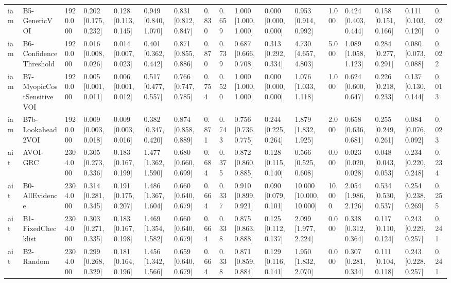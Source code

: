 \begin{table}[!ht]
{\begin{tabular}{lllllllllllllllll}
iam & B5-GenericVOI & 1920.000 & 0.202 [0.175, 0.232] & 0.128 [0.113, 0.145] & 0.949 [0.840, 1.070] & 0.831 [0.812, 0.847] & 0.830 & 0.659 & 1.000 [1.000, 1.000] & 0.000 [0.000, 0.000] & 0.953 [0.914, 0.992] & 1.000 & 0.424 [0.403, 0.444] & 0.158 [0.151, 0.166] & 0.111 [0.103, 0.120] & 0.020 \\
iam & B6-ConfidenceThreshold & 1920.000 & 0.016 [0.008, 0.026] & 0.014 [0.007, 0.023] & 0.401 [0.362, 0.442] & 0.871 [0.855, 0.886] & 0.870 & 0.739 & 0.687 [0.666, 0.708] & 0.313 [0.292, 0.334] & 4.730 [4.657, 4.803] & 5.000 & 1.089 [1.058, 1.123] & 0.284 [0.277, 0.291] & 0.080 [0.073, 0.088] & 0.022 \\
iam & B7-MyopicCostSensitiveVOI & 1920.000 & 0.005 [0.001, 0.011] & 0.006 [0.001, 0.012] & 0.517 [0.477, 0.557] & 0.766 [0.747, 0.785] & 0.754 & 0.520 & 1.000 [1.000, 1.000] & 0.000 [0.000, 0.000] & 1.076 [1.033, 1.118] & 1.000 & 0.624 [0.600, 0.647] & 0.226 [0.218, 0.233] & 0.137 [0.130, 0.144] & 0.013 \\
iam & B7b-Lookahead2VOI & 1920.000 & 0.009 [0.003, 0.018] & 0.009 [0.003, 0.016] & 0.382 [0.347, 0.420] & 0.874 [0.858, 0.889] & 0.871 & 0.743 & 0.756 [0.736, 0.775] & 0.244 [0.225, 0.264] & 1.879 [1.832, 1.925] & 2.000 & 0.658 [0.636, 0.681] & 0.255 [0.249, 0.261] & 0.084 [0.076, 0.092] & 0.023 \\
ait & AVOI-GRC & 2304.000 & 0.305 [0.273, 0.336] & 0.183 [0.167, 0.199] & 1.477 [1.362, 1.590] & 0.680 [0.660, 0.699] & 0.684 & 0.375 & 0.872 [0.860, 0.885] & 0.128 [0.115, 0.140] & 0.566 [0.525, 0.608] & 0.000 & 0.023 [0.020, 0.028] & 0.048 [0.043, 0.053] & 0.234 [0.220, 0.248] & 0.234 \\
ait & B0-AllEvidence & 2304.000 & 0.314 [0.281, 0.345] & 0.191 [0.175, 0.207] & 1.486 [1.367, 1.604] & 0.660 [0.640, 0.679] & 0.664 & 0.337 & 0.910 [0.899, 0.921] & 0.090 [0.079, 0.101] & 10.000 [10.000, 10.000] & 10.000 & 2.054 [1.986, 2.126] & 0.534 [0.530, 0.537] & 0.254 [0.238, 0.269] & 0.255 \\
ait & B1-FixedChecklist & 2304.000 & 0.303 [0.271, 0.335] & 0.183 [0.167, 0.198] & 1.469 [1.354, 1.582] & 0.660 [0.640, 0.679] & 0.664 & 0.338 & 0.875 [0.863, 0.888] & 0.125 [0.112, 0.137] & 2.099 [1.977, 2.224] & 0.000 & 0.338 [0.312, 0.364] & 0.117 [0.110, 0.124] & 0.243 [0.229, 0.257] & 0.241 \\
ait & B2-Random & 2304.000 & 0.299 [0.268, 0.329] & 0.181 [0.164, 0.196] & 1.456 [1.342, 1.566] & 0.659 [0.640, 0.679] & 0.664 & 0.338 & 0.871 [0.859, 0.884] & 0.129 [0.116, 0.141] & 1.950 [1.832, 2.070] & 0.000 & 0.307 [0.281, 0.334] & 0.111 [0.104, 0.118] & 0.243 [0.228, 0.257] & 0.241 \\

\end{tabular}}
\end{table}
